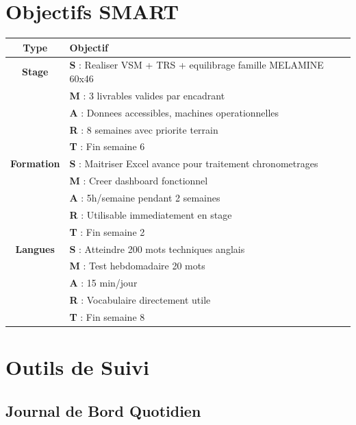 \documentclass[12pt,a4paper]{article}
\begin{document}
\newpage

\section{Objectifs SMART}

\begin{table}[h]
\centering
\small
\begin{tabular}{|c|p{11cm}|}
\hline
\rowcolor{gray!20}
\textbf{Type} & \textbf{Objectif} \\
\hline
\textbf{Stage} & \textbf{S} : Realiser VSM + TRS + equilibrage famille MELAMINE 60x46 \\
& \textbf{M} : 3 livrables valides par encadrant \\
& \textbf{A} : Donnees accessibles, machines operationnelles \\
& \textbf{R} : 8 semaines avec priorite terrain \\
& \textbf{T} : Fin semaine 6 \\
\hline
\textbf{Formation} & \textbf{S} : Maitriser Excel avance pour traitement chronometrages \\
& \textbf{M} : Creer dashboard fonctionnel \\
& \textbf{A} : 5h/semaine pendant 2 semaines \\
& \textbf{R} : Utilisable immediatement en stage \\
& \textbf{T} : Fin semaine 2 \\
\hline
\textbf{Langues} & \textbf{S} : Atteindre 200 mots techniques anglais \\
& \textbf{M} : Test hebdomadaire 20 mots \\
& \textbf{A} : 15 min/jour \\
& \textbf{R} : Vocabulaire directement utile \\
& \textbf{T} : Fin semaine 8 \\
\hline
\end{tabular}
\end{table}

\newpage

\section{Outils de Suivi}

\subsection*{Journal de Bord Quotidien}
\end{document}
